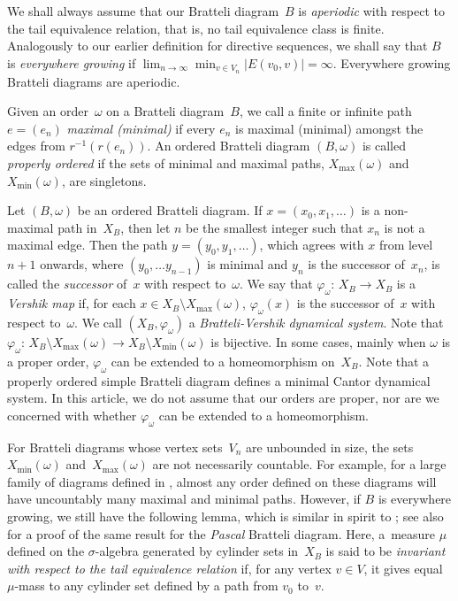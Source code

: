 \documentclass{amsart}
\theoremstyle{definition}
\theoremstyle{remark}
\numberwithin{equation}{section}
\begin{document}
We shall always assume that our Bratteli diagram~$B$ is  \emph{aperiodic} with respect to the tail equivalence relation, that is, no tail equivalence class is finite. 
Analogously to our earlier definition for directive sequences, we shall say that $B$ is \emph{everywhere growing} if $\lim_{n\to\infty} \min_{v\in V_n} |E(v_0, v)|= \infty$. 
Everywhere growing Bratteli diagrams are aperiodic.
 
Given an order~$\omega$ on a Bratteli diagram~$B$, we call a finite or infinite path $e=(e_n)$ \emph{maximal (minimal)} if every $e_n$ is maximal (minimal) amongst the edges from $r^{-1}(r(e_n))$.  
An ordered Bratteli diagram $(B, \omega)$ is called \emph{properly ordered} if the sets of minimal and maximal paths, $X_{\max}(\omega)$ and $X_{\min}(\omega)$, are singletons. 

Let $(B,\omega)$ be an ordered Bratteli diagram. 
If $x=(x_0, x_1, \ldots)$ is a non-maximal path in~$X_B$, then let $n$ be the smallest integer such that $x_n$ is not a maximal edge. 
Then the path $y=(y_0,y_1, \ldots)$, which agrees with $x$ from level $n{+}1$ onwards, where $(y_0,\ldots y_{n-1})$ is minimal and $y_n$ is the successor of~$x_n$, is called the \emph{successor} of~$x$ with respect to~$\omega$. 
We say that $\varphi_\omega:\, X_B  \to X_B$ is a \emph{Vershik map} if, for each $x \in X_B \setminus X_{\max}(\omega)$, $\varphi_\omega(x)$ is the successor of~$x$ with respect to~$\omega$.
We call $(X_B,\varphi_\omega)$ a \emph{Bratteli-Vershik dynamical system}.
Note that $\varphi_\omega:\, X_B \setminus X_{\max}(\omega) \to X_B \setminus X_{\min}(\omega)$ is bijective. 
In some cases, mainly when $\omega$ is a proper order, $\varphi_\omega$ can be extended to a homeomorphism on~$X_B$. 
Note that a properly ordered simple Bratteli diagram defines a minimal Cantor dynamical system.   
In this article, we do not assume that our orders are proper, nor are we concerned with whether $\varphi_\omega$ can be extended to a homeomorphism. 

For Bratteli diagrams whose vertex sets~$V_n$ are unbounded in size, the sets $X_{\min}(\omega)$ and~$X_{\max}(\omega)$ are not necessarily countable. 
For example, for a large family of diagrams defined in \cite{JQY}, almost any order defined on these diagrams will have uncountably many maximal and minimal paths. 
However, if $B$ is everywhere growing, we still have the following lemma, which is similar in spirit to \cite[Lemma~2.7]{BKMS:2010}; see also \cite[Prop 2.1]{FPS:2015} for a proof of the same result for the \emph{Pascal} Bratteli diagram.
Here, a~measure $\mu$ defined on the $\sigma$-algebra generated by cylinder sets in~$X_B$ is said to be \emph{invariant with respect to the tail equivalence relation} if, for any vertex $v\in V$, it gives equal $\mu$-mass to any cylinder set defined by a path from $v_0$ to~$v$.
  
\end{document}
